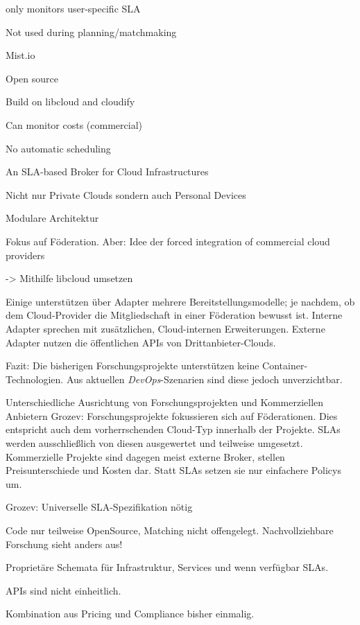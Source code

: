 only monitors user-specific SLA 

Not used during planning/matchmaking 



Mist.io 

Open source 

Build on libcloud and cloudify 

Can monitor costs (commercial) 

No automatic scheduling 



An SLA-based Broker for Cloud Infrastructures 

Nicht nur Private Clouds sondern auch Personal Devices 

Modulare Architektur 

Fokus auf Föderation. Aber: Idee der forced integration of commercial cloud providers 

-> Mithilfe libcloud umsetzen 




Einige unterstützen über Adapter mehrere Bereitstellungsmodelle; je nachdem, ob dem Cloud-Provider die Mitgliedschaft in einer Föderation bewusst ist. Interne Adapter sprechen mit zusätzlichen, Cloud-internen Erweiterungen. Externe Adapter nutzen die öffentlichen APIs von Drittanbieter-Clouds.


Fazit: Die bisherigen Forschungsprojekte unterstützen keine Container-Technologien. Aus aktuellen \emph{DevOps}-Szenarien sind diese jedoch unverzichtbar.

Unterschiedliche Ausrichtung von Forschungsprojekten und Kommerziellen Anbietern Grozev: Forschungsprojekte fokussieren sich auf Föderationen. Dies entspricht auch dem vorherrschenden Cloud-Typ innerhalb der Projekte. SLAs werden ausschließlich von diesen ausgewertet und teilweise umgesetzt. Kommerzielle Projekte sind dagegen meist externe Broker, stellen Preisunterschiede und Kosten dar. Statt SLAs setzen sie nur einfachere Policys um.

Grozev: Universelle SLA-Spezifikation nötig

Code nur teilweise OpenSource, Matching nicht offengelegt. Nachvollziehbare Forschung sieht anders aus!

Proprietäre Schemata für Infrastruktur, Services und wenn verfügbar SLAs. 

APIs sind nicht einheitlich.

Kombination aus Pricing und Compliance bisher einmalig.






